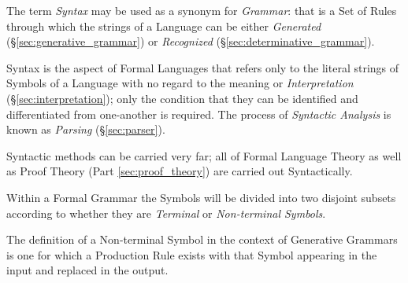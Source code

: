 The term \emph{Syntax} may be used as a synonym for \emph{Grammar}:
that is a Set of Rules through which the strings of a Language can be
either \emph{Generated} (\S\ref{sec:generative_grammar}) or
\emph{Recognized} (\S\ref{sec:determinative_grammar}).

Syntax is the aspect of Formal Languages that refers only to the
literal strings of Symbols of a Language with no regard to the meaning
or \emph{Interpretation} (\S\ref{sec:interpretation}); only the
condition that they can be identified and differentiated from
one-another is required. The process of \emph{Syntactic Analysis} is
known as \emph{Parsing} (\S\ref{sec:parser}).

Syntactic methods can be carried very far; all of Formal Language
Theory as well as Proof Theory (Part \ref{sec:proof_theory}) are
carried out Syntactically.

Within a Formal Grammar the Symbols will be divided into two disjoint
subsets according to whether they are \emph{Terminal} or
\emph{Non-terminal Symbols}.

The definition of a Non-terminal Symbol in the context of Generative
Grammars is one for which a Production Rule exists with that Symbol
appearing in the input and replaced in the output.

